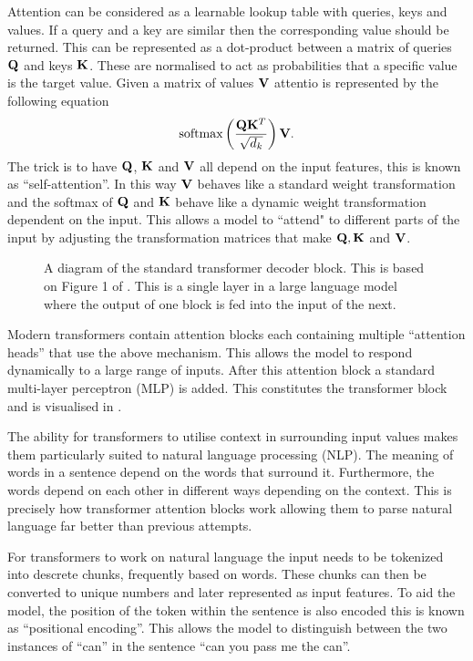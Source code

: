 Attention can be considered as a learnable lookup table with queries, keys and values.
If a query and a key are similar then the corresponding value should be returned.
This can be represented as a dot-product between a matrix of queries $\mathbf{Q}$ and keys $\mathbf{K}$.
These are normalised to act as probabilities that a specific value is the target value.
Given a matrix of values $\mathbf{V}$ attentio is represented by the following equation
\begin{equation*}
    \text{softmax}\left(\frac{\mathbf{Q}\mathbf{K}^T}{\sqrt{d_k}}\right)\mathbf{V}.
\end{equation*}
The trick is to have $\mathbf{Q}$, $\mathbf{K}$ and $\mathbf{V}$ all depend on the input features, this is known as ``self-attention''.
In this way $\mathbf{V}$ behaves like a standard weight transformation and the softmax of $\mathbf{Q}$ and $\mathbf{K}$ behave like a dynamic weight transformation dependent on the input.
This allows a model to ``attend" to different parts of the input by adjusting the transformation matrices that make $\mathbf{Q}, \mathbf{K}$ and $\mathbf{V}$.

\begin{figure}
    \centering
    \captionsetup{width=.9\textwidth}
    
    \caption{A diagram of the standard transformer decoder block. This is based on Figure 1 of \citet{transformers}. This is a single layer in a large language model where the output of one block is fed into the input of the next.}
    \label{fig:transformer}
\end{figure}

Modern transformers contain attention blocks each containing multiple ``attention heads'' that use the above mechanism.
This allows the model to respond dynamically to a large range of inputs.
After this attention block a standard multi-layer perceptron (MLP) is added.
This constitutes the transformer block and is visualised in .

The ability for transformers to utilise context in surrounding input values makes them particularly suited to natural language processing (NLP).
The meaning of words in a sentence depend on the words that surround it.
Furthermore, the words depend on each other in different ways depending on the context.
This is precisely how transformer attention blocks work allowing them to parse natural language far better than previous attempts.

For transformers to work on natural language the input needs to be tokenized into descrete chunks, frequently based on words.
These chunks can then be converted to unique numbers and later represented as input features.
To aid the model, the position of the token within the sentence is also encoded this is known as ``positional encoding''.
This allows the model to distinguish between the two instances of ``can'' in the sentence ``can you pass me the can''.

